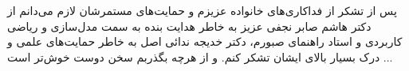 پس از تشکر از فداکاری‌های خانواده عزیزم و حمایت‌های مستمرشان لازم می‌دانم از دکتر هاشم صابر نجفی عزیز  به خاطر هدایت بنده به سمت مدل‌سازی و ریاضی کاربردی و استاد راهنمای صبورم، دکتر خدیجه ندائی اصل به خاطر حمایت‌های علمی و درک بسیار بالای ایشان تشکر کنم. و از هرچه بگذربم سخن دوست خوش‌تر است ...


